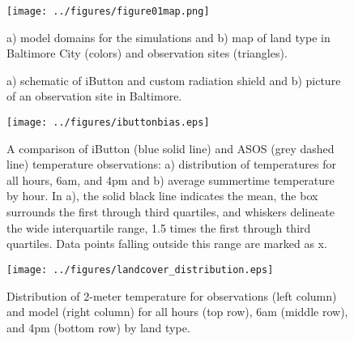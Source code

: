 \documentclass[draft,linenumbers]{agujournal}
\begin{document}




%
%
%
%
\begin{figure}[h]
\centering
\texttt{[image: ../figures/figure01map.png]}
\caption{a) model domains for the simulations and b) map of land type in Baltimore City (colors) and observation sites (triangles).}
\label{fig:map}
 \end{figure}
 
 \begin{figure}[h]
\centering
\caption{a) schematic of iButton and custom radiation shield and b) picture of an observation site in Baltimore.}
\label{fig:ibutton}
 \end{figure}
 
\begin{figure}[h]
\centering
\texttt{[image: ../figures/ibuttonbias.eps]}
\caption{A comparison of iButton (blue solid line) and ASOS (grey dashed line) temperature observations: a) distribution of temperatures for all hours,  6am, and 4pm and b) average summertime temperature by hour. In a), the solid black line indicates the mean, the box surrounds the first through third quartiles, and whiskers delineate the wide interquartile range, 1.5 times the first through third quartiles. Data points falling outside this range are marked as x. }
\label{fig:bias}
\end{figure}



\begin{figure}[h]
\centering
\texttt{[image: ../figures/landcover\_distribution.eps]}
\caption{Distribution of 2-meter temperature for observations (left column) and model (right column) for all hours (top row), 6am (middle row), and 4pm (bottom row) by land type. }
\label{fig:hist}
\end{figure}
\end{document}

